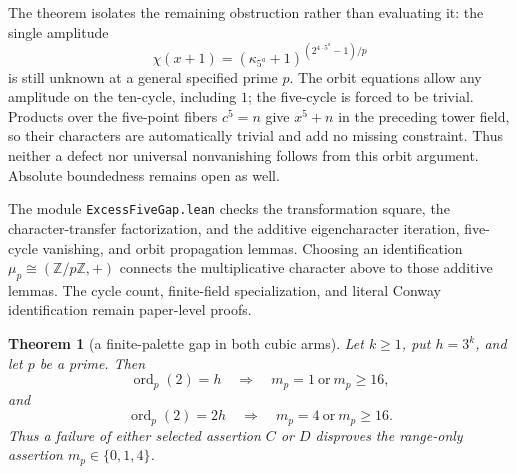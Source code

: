 \documentclass[11pt]{article}
\newtheorem{theorem}{Theorem}[section]
\theoremstyle{definition}
\theoremstyle{remark}
\begin{document}
The theorem isolates the remaining obstruction rather than evaluating it:
the single amplitude
\[
 \chi(x+1)=(\kappa_{5^a}+1)^{(2^{4\cdot5^a}-1)/p}
\]
is still unknown at a general specified prime $p$.
The orbit equations allow any amplitude on the ten-cycle, including $1$;
the five-cycle is forced to be trivial.  Products over the five-point
fibers $c^5=n$ give $x^5+n$ in the preceding tower field, so their
characters are automatically trivial and add no missing constraint.
Thus neither a defect nor universal nonvanishing follows from this orbit
argument.  Absolute boundedness remains open as well.

The module \texttt{ExcessFiveGap.lean} checks the transformation square,
the character-transfer factorization, and the additive eigencharacter
iteration, five-cycle vanishing, and orbit propagation lemmas.
Choosing an identification $\mu_p\cong(\mathbb Z/p\mathbb Z,+)$
connects the multiplicative character above to those additive lemmas.
The cycle count, finite-field specialization, and literal Conway
identification remain paper-level proofs.

\begin{theorem}[a finite-palette gap in both cubic arms]
\label{thm:cubic-palette-gap}
Let $k\geq1$, put $h=3^k$, and let $p$ be a prime.  Then
\[
 \operatorname{ord}_p(2)=h
 \quad\Longrightarrow\quad m_p=1\ \text{or}\ m_p\geq16,
\]
and
\[
 \operatorname{ord}_p(2)=2h
 \quad\Longrightarrow\quad m_p=4\ \text{or}\ m_p\geq16.
\]
Thus a failure of either selected assertion $C$ or $D$ disproves the
range-only assertion $m_p\in\{0,1,4\}$.
\end{theorem}
\end{document}
